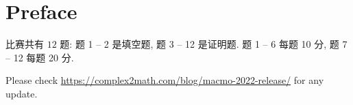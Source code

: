 \documentclass[10pt]{article}
\begin{document}


{}
\section*{Preface}

比赛共有 $12$ 题:
题 1 -- 2 是填空题,
题 3 -- 12 是证明题.
题 1 -- 6 每题 10 分,
题 7 -- 12 每题 20 分.

\bigskip

Please check \url{https://complex2math.com/blog/macmo-2022-release/} for any update.

\newpage
























\end{document}
